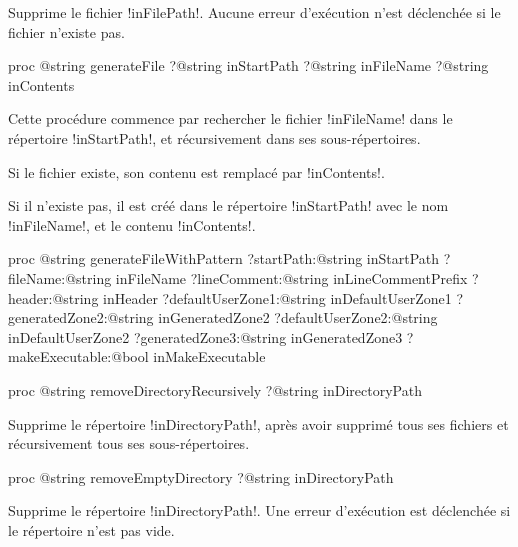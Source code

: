 Supprime le fichier \ggst!inFilePath!. Aucune erreur d'exécution n'est déclenchée si le fichier n'existe pas.








\begin{galgas3box}
proc @string generateFile
   ?@string inStartPath
   ?@string inFileName
   ?@string inContents
\end{galgas3box}

Cette procédure commence par rechercher le fichier \ggst!inFileName! dans le répertoire \ggst!inStartPath!, et récursivement dans ses sous-répertoires.

Si le fichier existe, son contenu est remplacé par \ggst!inContents!.

Si il n'existe pas, il est créé dans le répertoire \ggst!inStartPath! avec le nom \ggst!inFileName!, et le contenu \ggst!inContents!.










\begin{galgas3box}
proc @string generateFileWithPattern
   ?startPath:@string inStartPath
   ?fileName:@string inFileName
   ?lineComment:@string inLineCommentPrefix
   ?header:@string inHeader
   ?defaultUserZone1:@string inDefaultUserZone1
   ?generatedZone2:@string inGeneratedZone2
   ?defaultUserZone2:@string inDefaultUserZone2
   ?generatedZone3:@string inGeneratedZone3
   ?makeExecutable:@bool inMakeExecutable
\end{galgas3box}








\begin{galgas3box}
proc @string removeDirectoryRecursively ?@string inDirectoryPath
\end{galgas3box}

Supprime le répertoire \ggst!inDirectoryPath!, après avoir supprimé tous ses fichiers et récursivement tous ses sous-répertoires.









\begin{galgas3box}
proc @string removeEmptyDirectory ?@string inDirectoryPath
\end{galgas3box}

Supprime le répertoire \ggst!inDirectoryPath!. Une erreur d'exécution est déclenchée si le répertoire n'est pas vide.


